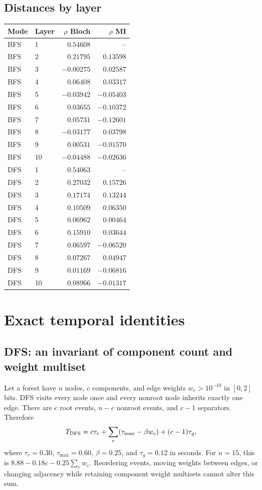 \documentclass[11pt,a4paper]{article}
\begin{document}
\subsection{Distances by layer}
{\small\setlength{\tabcolsep}{5pt}
\begin{longtable}{llrr}
\toprule
Mode & Layer & $\rho$ Bloch & $\rho$ MI \\
\midrule\endhead
BFS & 1 & $0.54608$ & -- \\
BFS & 2 & $0.21795$ & $0.13598$ \\
BFS & 3 & $-0.00275$ & $0.02587$ \\
BFS & 4 & $0.06408$ & $0.03317$ \\
BFS & 5 & $-0.03942$ & $-0.05403$ \\
BFS & 6 & $0.03655$ & $-0.10372$ \\
BFS & 7 & $0.05731$ & $-0.12601$ \\
BFS & 8 & $-0.03177$ & $0.03798$ \\
BFS & 9 & $0.00531$ & $-0.01570$ \\
BFS & 10 & $-0.04488$ & $-0.02636$ \\
DFS & 1 & $0.54063$ & -- \\
DFS & 2 & $0.27032$ & $0.15726$ \\
DFS & 3 & $0.17174$ & $0.13244$ \\
DFS & 4 & $0.10509$ & $0.06350$ \\
DFS & 5 & $0.06962$ & $0.00464$ \\
DFS & 6 & $0.15910$ & $0.03644$ \\
DFS & 7 & $0.06597$ & $-0.06520$ \\
DFS & 8 & $0.07267$ & $0.04947$ \\
DFS & 9 & $0.01169$ & $-0.06816$ \\
DFS & 10 & $0.08966$ & $-0.01317$ \\
\bottomrule
\end{longtable}}


\section{Exact temporal identities}
\subsection{DFS: an invariant of component count and weight multiset}
Let a forest have $n$ nodes, $c$ components, and edge weights $w_e>10^{-10}$ in $[0,2]$ bits. DFS visits every node once and every nonroot node inherits exactly one edge. There are $c$ root events, $n-c$ nonroot events, and $c-1$ separators. Therefore
\[
T_{\rm DFS}=c\tau_r+\sum_e(\tau_{\max}-\beta w_e)+(c-1)\tau_g,
\]
where $\tau_r=0.30$, $\tau_{\max}=0.60$, $\beta=0.25$, and $\tau_g=0.12$ in seconds. For $n=15$, this is $8.88-0.18c-0.25\sum_e w_e$. Reordering events, moving weights between edges, or changing adjacency while retaining component weight multisets cannot alter this sum.
\end{document}
